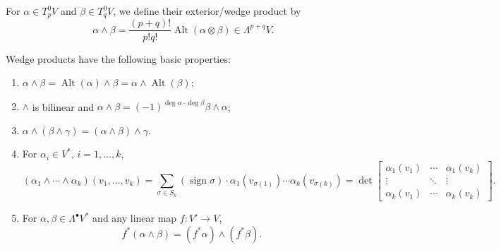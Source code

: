 \documentclass[english,letterpaper]{article}%
\numberwithin{equation}{section}
\numberwithin{figure}{section}
\numberwithin{table}{section}
\theoremstyle{definition}
\theoremstyle{definition}
\theoremstyle{definition}
\theoremstyle{plain}
\theoremstyle{plain}
\theoremstyle{plain}
\theoremstyle{plain}
\theoremstyle{remark}
\theoremstyle{remark}
\def\red{\color{red}}
\DeclareMathOperator{\sign}{sign}
\DeclareMathOperator{\Alt}{Alt}
\newcommand{\PRLsep}{   %
           \noindent\makebox[\linewidth]{
                \resizebox{0.5\linewidth}{1pt}{$\blacklozenge$}}}
\begin{document}
\begin{defn}
For $\alpha\in T^0_p V$ and $\beta\in T^0_q V$, we define their exterior/wedge product by
\[\alpha\wedge\beta=\frac{(p+q)!}{p!q!}\Alt (\alpha\otimes \beta)\in \Lambda^{p+q}V.\]
\end{defn}
Wedge products have the following basic properties:
\begin{enumerate}
    \item $\alpha\wedge\beta=\Alt(\alpha)\wedge\beta=\alpha\wedge\Alt(\beta)$;
    \item $\wedge$ is bilinear and $\alpha\wedge\beta=(-1)^{\deg\alpha\cdot\deg\beta}\beta\wedge\alpha$;
    \item $\alpha\wedge(\beta\wedge\gamma)=(\alpha\wedge\beta)\wedge\gamma$.
    \item For $\alpha_i\in V^\ast$, $i=1,\ldots,k$, 
    \[(\alpha_1\wedge\cdots\wedge\alpha_k)(v_1,\ldots,v_k)=\sum_{\sigma\in S_k}(\sign\sigma)\cdot \alpha_1(v_{\sigma(1)})\cdots\alpha_k(v_{\sigma(k)})=\det \begin{bmatrix}
         \alpha_1(v_1) & \cdots & \alpha_1(v_k)  \\
         \vdots & \ddots & \vdots \\
         \alpha_k(v_1) & \cdots & \alpha_k(v_k) 
    \end{bmatrix}.\label{form determinant f-la}\]
    \item For $\alpha,\beta\in\Lambda^\bullet V^\ast$ and any linear map $f:V'\to V$,
    \[f^\ast(\alpha\wedge\beta)=(f^\ast\alpha)\wedge(f^\ast\beta).\label{pullbacks of wedges}\]
\end{enumerate}

\end{document}
